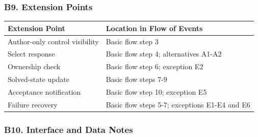 \documentclass[12pt]{article}
\renewcommand{\baselinestretch}{1.5}
\begin{document}
\hypertarget{sec:b9-extension-points}{}
\subsubsection*{B9. Extension Points}
\par\medskip

\begingroup
\small
\renewcommand{\baselinestretch}{1.0}\selectfont
\renewcommand{\arraystretch}{1.15}
\setlength{\tabcolsep}{6pt}
\begin{longtable}{|>{\raggedright\arraybackslash}p{}|>{\raggedright\arraybackslash}p{}|}
\hline
\textbf{Extension Point} & \textbf{Location in Flow of Events} \\ \hline
\endhead
Author-only control visibility & Basic flow step 3 \\ \hline
Select response & Basic flow step 4; alternatives A1-A2 \\ \hline
Ownership check & Basic flow step 6; exception E2 \\ \hline
Solved-state update & Basic flow steps 7-9 \\ \hline
Acceptance notification & Basic flow step 10; exception E5 \\ \hline
Failure recovery & Basic flow steps 5-7; exceptions E1-E4 and E6 \\ \hline
\end{longtable}
\endgroup
\par\medskip

\hypertarget{sec:b10-interface-and-data-notes}{}
\subsubsection*{B10. Interface and Data Notes}
\par\medskip
\end{document}
